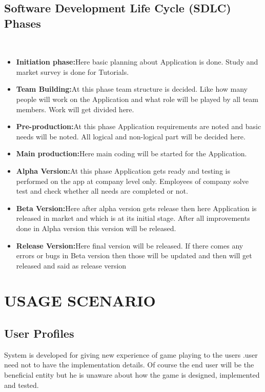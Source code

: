 \documentclass[oneside,a4paper,12pt]{report}
\begin{document}
\subsection{Software Development Life Cycle (SDLC) Phases}
\\
\begin{itemize}
\item \textbf{Initiation phase:}Here basic planning about Application is done. Study and
market survey is done for Tutorials.\\
\item\textbf{Team Building:}At this phase team structure is decided. Like how
many people will work on the Application and what role will be played by all
team members. Work will get divided here.\\
\item\textbf{Pre-production:}At this phase Application requirements are noted and basic
needs will be noted. All logical and non-logical part will be decided here.\\
\item\textbf{Main production:}Here main coding will be started for the Application.\\
\item\textbf{Alpha Version:}At this phase Application gets ready and testing is performed
on the app at company level only. Employees of company solve test
and check whether all needs are completed or not.\\
\item\textbf{Beta Version:}Here after alpha version gets release then here Application is
released in market and which is at its initial stage. After all improvements
done in Alpha version this version will be released.\\
\item\textbf{Release Version:}Here final version will be released. If there comes
any errors or bugs in Beta version then those will be updated and then
will get released and said as release version\\
\end{itemize}

\section{USAGE SCENARIO}

\subsection{User Profiles}
\hspace*{0.3in}System is developed for giving new experience of game playing to the users .user need not to have the implementation details. Of course the end user will be the beneficial entity but he is unaware about how the game is designed, implemented and tested.\\
\end{document}
